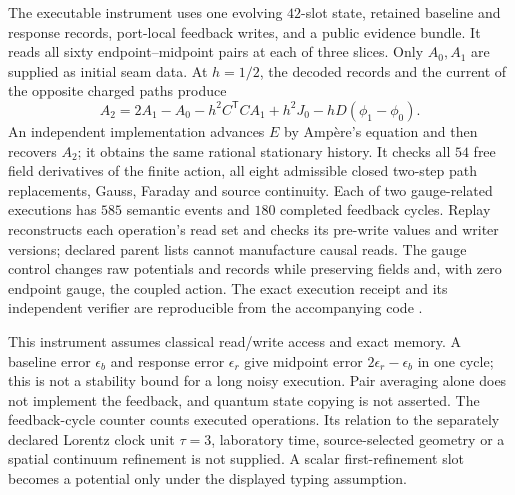 \documentclass[11pt]{article}
\begin{document}
The executable instrument uses one evolving \(42\)-slot state, retained
baseline and response records, port-local feedback writes, and a public
evidence bundle. It reads all sixty endpoint--midpoint pairs at each of three
slices. Only \(A_0,A_1\) are supplied as initial seam data. At \(h=1/2\), the
decoded records and the current of the opposite charged paths produce
\[
 A_2=2A_1-A_0-h^2C^{\mathsf T}CA_1+h^2J_0-hD(\phi_1-\phi_0).
\]
An independent implementation advances \(E\) by Amp\`ere's equation and then
recovers \(A_2\); it obtains the same rational stationary history. It checks
all \(54\) free field derivatives of the finite action, all eight admissible
closed two-step path replacements, Gauss, Faraday and source continuity.
Each of two gauge-related executions has \(585\) semantic events and
\(180\) completed feedback cycles. Replay reconstructs each operation's read
set and checks its pre-write values and writer versions; declared parent
lists cannot manufacture causal reads. The gauge control changes raw
potentials and records while preserving fields and, with zero endpoint gauge,
the coupled action. The exact execution receipt and its independent verifier
are reproducible from the accompanying code \cite{ophrepo}.

This instrument assumes classical read/write access and exact memory. A
baseline error \(\epsilon_b\) and response error \(\epsilon_r\) give midpoint
error \(2\epsilon_r-\epsilon_b\) in one cycle; this is not a stability bound
for a long noisy execution. Pair averaging alone does not implement the
feedback, and quantum state copying is not asserted. The feedback-cycle
counter counts executed operations. Its relation to the separately declared
Lorentz clock unit \(\tau=3\), laboratory time, source-selected geometry or
a spatial continuum refinement is not supplied. A scalar first-refinement
slot becomes a potential only under the displayed typing assumption.















\end{document}
